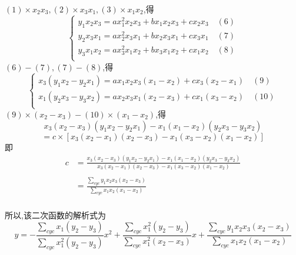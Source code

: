 \documentclass[UTF8]{ctexart}
\begin{document}
$(1) \times x_{2}x_{3},(2) \times x_{3}x_{1},(3) \times x_{1}x_{2}$,得
\[
\begin{cases}
y_{1}x_{2}x_{3}=ax_{1}^{2}x_{2}x_{3}+bx_{1}x_{2}x_{3}+cx_{2}x_{3}\quad (6)\\
y_{2}x_{3}x_{1}=ax_{2}^{2}x_{3}x_{1}+bx_{2}x_{3}x_{1}+cx_{3}x_{1}\quad (7)\\
y_{3}x_{1}x_{2}=ax_{3}^{2}x_{1}x_{2}+bx_{3}x_{1}x_{2}+cx_{1}x_{2}\quad (8)\\
\end{cases}
\]
$(6)-(7),(7)-(8)$,得
\[
\begin{cases}
x_{3}(y_{1}x_{2}-y_{2}x_{1})=ax_{1}x_{2}x_{3}(x_{1}-x_{2})+cx_{3}(x_{2}-x_{1})\quad (9)\\
x_{1}(y_{2}x_{3}-y_{3}x_{2})=ax_{2}x_{3}x_{1}(x_{2}-x_{3})+cx_{1}(x_{3}-x_{2})\quad (10)\\
\end{cases}
\]
$(9)\times(x_{2}-x_{3})-(10)\times(x_{1}-x_{2})$,得
\[x_{3}(x_{2}-x_{3})(y_{1}x_{2}-y_{2}x_{1})-x_{1}(x_{1}-x_{2})(y_{2}x_{3}-y_{3}x_{2})\]
\[=c\times[x_{3}(x_{2}-x_{1})(x_{2}-x_{3})-x_{1}(x_{3}-x_{2})(x_{1}-x_{2})]\]
即
\[
\begin{aligned}
c&=\frac{x_{3}(x_{2}-x_{3})(y_{1}x_{2}-y_{2}x_{1})-x_{1}(x_{1}-x_{2})(y_{2}x_{3}-y_{3}x_{2})}{x_{3}(x_{2}-x_{1})(x_{2}-x_{3})-x_{1}(x_{3}-x_{2})(x_{1}-x_{2})}\\
& \\
&=\frac{\sum\limits_{cyc}y_{1}x_{2}x_{3}(x_{2}-x_{3})}{\sum\limits_{cyc}x_{1}x_{2}(x_{1}-x_{2})}\\
\end{aligned}
\]

所以,该二次函数的解析式为
\[y=-\frac{\sum\limits_{cyc}x_{1}(y_{2}-y_{3})}{\sum\limits_{cyc}x_{1}^{2}(y_{2}-y_{3})}x^{2}
+\frac{\sum\limits_{cyc}x_{1}^{2}(y_{2}-y_{3})}{\sum\limits_{cyc}x_{1}^{2}(x_{2}-x_{3})}x
+\frac{\sum\limits_{cyc}y_{1}x_{2}x_{3}(x_{2}-x_{3})}{\sum\limits_{cyc}x_{1}x_{2}(x_{1}-x_{2})}\]
\end{document}
